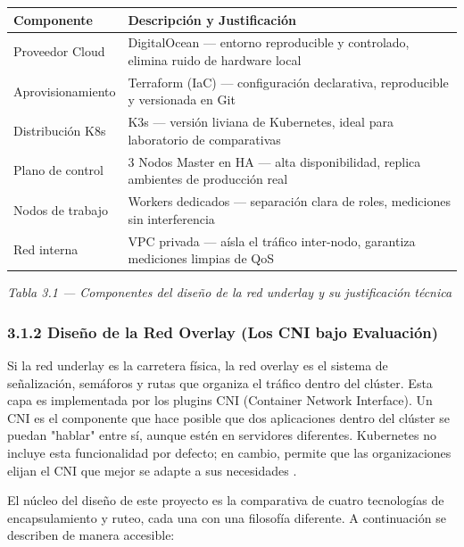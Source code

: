 \documentclass[journal]{IEEEtran}
\begin{document}
\begin{table}[htbp]
\centering
\scriptsize
\begin{tabularx}{\textwidth}{|Y|Y|}
\hline
\textbf{Componente} & \textbf{Descripción y Justificación} \\
\hline
Proveedor Cloud & DigitalOcean --- entorno reproducible y controlado, elimina ruido de hardware local \\
Aprovisionamiento & Terraform (IaC) --- configuración declarativa, reproducible y versionada en Git \\
Distribución K8s & K3s --- versión liviana de Kubernetes, ideal para laboratorio de comparativas \\
Plano de control & 3 Nodos Master en HA --- alta disponibilidad, replica ambientes de producción real \\
Nodos de trabajo & Workers dedicados --- separación clara de roles, mediciones sin interferencia \\
Red interna & VPC privada --- aísla el tráfico inter-nodo, garantiza mediciones limpias de QoS \\
\hline
\end{tabularx}
\end{table}

\begin{center}\emph{\emph{Tabla 3.1 --- Componentes del diseño de la red underlay y su justificación técnica}}\end{center}

\subsubsection{3.1.2 Diseño de la Red Overlay (Los CNI bajo Evaluación)}

Si la red underlay es la carretera física, la red overlay es el sistema de señalización, semáforos y rutas que organiza el tráfico dentro del clúster. Esta capa es implementada por los plugins CNI (Container Network Interface). Un CNI es el componente que hace posible que dos aplicaciones dentro del clúster se puedan "hablar" entre sí, aunque estén en servidores diferentes. Kubernetes no incluye esta funcionalidad por defecto; en cambio, permite que las organizaciones elijan el CNI que mejor se adapte a sus necesidades \cite{ref4,ref18}.

El núcleo del diseño de este proyecto es la comparativa de cuatro tecnologías de encapsulamiento y ruteo, cada una con una filosofía diferente. A continuación se describen de manera accesible:
\end{document}
